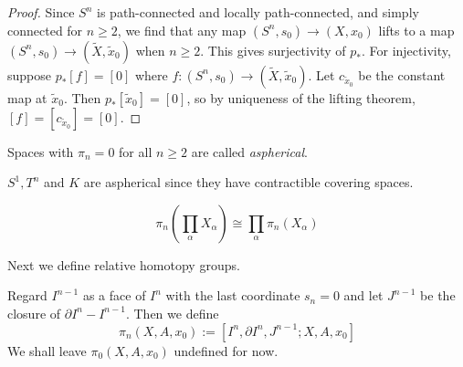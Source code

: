   \begin{proof}
      Since 
      $S^{n}$ is path-connected and locally path-connected,
      and simply connected for $n\ge 2$, we find that
      any map
      $\left( S^{n},s_0 \right) 
      \to \left( X, x_0 \right) $ lifts to a 
      map $\left( S^{n},s_0 \right) \to 
      \left( \tilde{X},\tilde{x}_0 \right) $ when
      $n\ge 2$. This gives surjectivity of
      $p_*$.
      For injectivity, suppose
      $p_* \left[ f \right] = \left[ 0 \right] $ where
      $f \colon \left( S^{n}, s_0 \right) \to 
      \left( \tilde{X},\tilde{x}_0 \right) $.
      Let $c_{\tilde{x}_0}$ be the constant map at
      $\tilde{x}_0$. Then
      $p_* \left[ \tilde{x}_0 \right] =
      \left[ 0 \right] $, so by uniqueness of the
      lifting theorem, 
      $\left[ f \right] = \left[ c_{\tilde{x}_0} \right] =
      \left[ 0 \right] $.
  \end{proof}

  \begin{definition}[Aspherical]
      Spaces with $\pi_n = 0$ for all
      $n\ge 2$ are called \textit{aspherical}.
  \end{definition}

  \begin{corollary}
      $S^{1}, T^{n}$ and $K$ are aspherical since
      they have contractible covering spaces.
  \end{corollary}


  \begin{proposition}[]
      \[
      \pi_n \left( \prod_{\alpha} X_{\alpha} \right) 
      \cong \prod_{\alpha} \pi_n \left( X_{\alpha} \right) 
      \] 
  \end{proposition}

  Next we define relative homotopy groups.

  \begin{definition}
      Regard $I^{n-1}$ as a face of $I^{n}$ with the last
      coordinate $s_n = 0$ and let
      $J^{n-1}$ be the closure of
      $\partial I^{n}- I^{n-1}$. Then
      we define 
      \[
      \pi_n \left( X, A, x_0 \right) 
      := \left[ I^{n},\partial I^{n}, J^{n-1};
      X , A , x_0\right] 
      \] 
      We shall leave $\pi_0 \left( X, A, x_0 \right) $ undefined
      for now.
  \end{definition}

